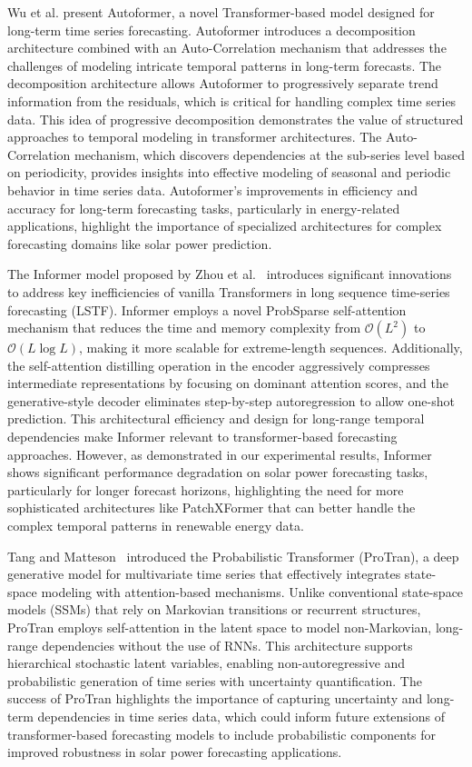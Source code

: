 \documentclass[12pt]{uomthesis}
\begin{document}
Wu et al. \cite{wu2021autoformer} present Autoformer, a novel Transformer-based model designed for long-term time series forecasting. Autoformer introduces a decomposition architecture combined with an Auto-Correlation mechanism that addresses the challenges of modeling intricate temporal patterns in long-term forecasts. The decomposition architecture allows Autoformer to progressively separate trend information from the residuals, which is critical for handling complex time series data. This idea of progressive decomposition demonstrates the value of structured approaches to temporal modeling in transformer architectures. The Auto-Correlation mechanism, which discovers dependencies at the sub-series level based on periodicity, provides insights into effective modeling of seasonal and periodic behavior in time series data. Autoformer's improvements in efficiency and accuracy for long-term forecasting tasks, particularly in energy-related applications, highlight the importance of specialized architectures for complex forecasting domains like solar power prediction.
 
The Informer model proposed by Zhou et al.~\cite{zhou2021informer} introduces significant innovations to address key inefficiencies of vanilla Transformers in long sequence time-series forecasting (LSTF). Informer employs a novel ProbSparse self-attention mechanism that reduces the time and memory complexity from $\mathcal{O}(L^2)$ to $\mathcal{O}(L\log L)$, making it more scalable for extreme-length sequences. Additionally, the self-attention distilling operation in the encoder aggressively compresses intermediate representations by focusing on dominant attention scores, and the generative-style decoder eliminates step-by-step autoregression to allow one-shot prediction. This architectural efficiency and design for long-range temporal dependencies make Informer relevant to transformer-based forecasting approaches. However, as demonstrated in our experimental results, Informer shows significant performance degradation on solar power forecasting tasks, particularly for longer forecast horizons, highlighting the need for more sophisticated architectures like PatchXFormer that can better handle the complex temporal patterns in renewable energy data.

Tang and Matteson~\cite{tang2021probabilistic} introduced the Probabilistic Transformer (ProTran), a deep generative model for multivariate time series that effectively integrates state-space modeling with attention-based mechanisms. Unlike conventional state-space models (SSMs) that rely on Markovian transitions or recurrent structures, ProTran employs self-attention in the latent space to model non-Markovian, long-range dependencies without the use of RNNs. This architecture supports hierarchical stochastic latent variables, enabling non-autoregressive and probabilistic generation of time series with uncertainty quantification. The success of ProTran highlights the importance of capturing uncertainty and long-term dependencies in time series data, which could inform future extensions of transformer-based forecasting models to include probabilistic components for improved robustness in solar power forecasting applications.
\end{document}
